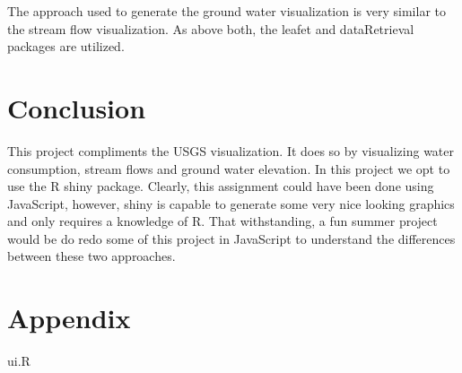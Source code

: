 \documentclass[english]{article}\usepackage[]{graphicx}\usepackage[]{color}
\begin{document}
The approach used to generate the ground water visualization is very
similar to the stream flow visualization. As above both, the leafet
and dataRetrieval packages are utilized. 


\section{Conclusion}

This project compliments the USGS visualization. It does so by visualizing
water consumption, stream flows and ground water elevation. In this
project we opt to use the R shiny package. Clearly, this assignment
could have been done using JavaScript, however, shiny is capable to
generate some very nice looking graphics and only requires a knowledge
of R. That withstanding, a fun summer project would be do redo some
of this project in JavaScript to understand the differences between
these two approaches. 

\newpage


\section*{\noindent Appendix}

ui.R
\end{document}
